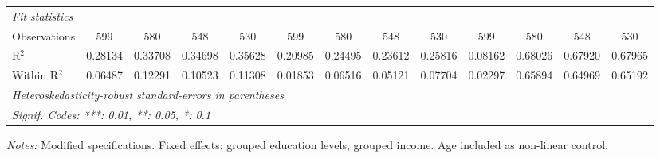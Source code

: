 \begin{tabular}{lcccccccccccc}
   \midrule
   \emph{Fit statistics}\\
   Observations                              & 599      & 580      & 548      & 530      & 599      & 580      & 548      & 530      & 599      & 580                   & 548            & 530\\  
   R$^2$                                     & 0.28134  & 0.33708  & 0.34698  & 0.35628  & 0.20985  & 0.24495  & 0.23612  & 0.25816  & 0.08162  & 0.68026               & 0.67920        & 0.67965\\  
   Within R$^2$                              & 0.06487  & 0.12291  & 0.10523  & 0.11308  & 0.01853  & 0.06516  & 0.05121  & 0.07704  & 0.02297  & 0.65894               & 0.64969        & 0.65192\\  
   \midrule \midrule
   \multicolumn{13}{l}{\emph{Heteroskedasticity-robust standard-errors in parentheses}}\\
   \multicolumn{13}{l}{\emph{Signif. Codes: ***: 0.01, **: 0.05, *: 0.1}}\\
\end{tabular}
 
\par \raggedright 
\textit{Notes:} Modified specifications. Fixed effects: grouped education levels, grouped income. Age included as non-linear control.
\par\endgroup




